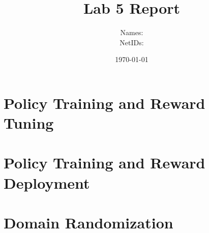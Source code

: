 \documentclass[11pt]{article}
\title{Lab 5 Report}
\author{
    Names: \\
    NetIDs:
}
\date{\today}
\begin{document}
\maketitle

\section{Policy Training and Reward Tuning}

\section{Policy Training and Reward Deployment}

\section{Domain Randomization}
\end{document}
